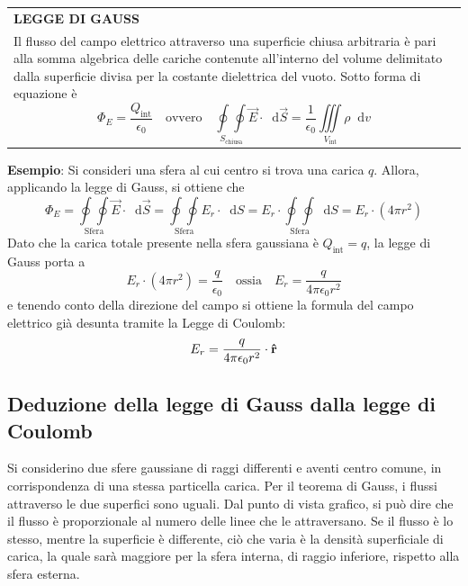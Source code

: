 \documentclass[a4paper]{extarticle}
\renewcommand\arraystretch{}
\newcommand\dif{\mathop{}\!\mathrm{d}}
\begin{document}
\vspace{1em}
\setlength{\tabcolsep}{14pt}
\renewcommand{\arraystretch}{2}
\noindent
\begin{tabularx}{\textwidth}{@{}|P|@{}}
    \hline
    {\textbf{LEGGE DI GAUSS}}\\
    \parbox{\linewidth}{Il flusso del campo elettrico attraverso una superficie chiusa arbitraria è pari alla somma algebrica delle cariche contenute all'interno del volume delimitato dalla superficie divisa per la costante dielettrica del vuoto.\\
    Sotto forma di equazione è
    \[\boxed{\Phi_E = \dfrac{Q_{\text{int}}}{\epsilon_0} \hspace{1em} \text{ovvero} \hspace{1em} \underset{S_\text{chiusa}}{\oint \oint} \vec{E} \cdot \dif \vec{S} = \frac{1}{\epsilon_0} \underset{V_\text{int}}{\iiint} \rho \dif v}\]
    \vspace{3mm}}\\
    \hline
\end{tabularx}

\vspace{2em}
\noindent
\textbf{Esempio}: Si consideri una sfera al cui centro si trova una carica $q$. Allora, applicando la legge di Gauss, si ottiene che
\[\Phi_E = \underset{\text{Sfera}}{\oint \oint} \vec{E} \cdot \dif \vec{S} = \underset{\text{Sfera}}{\oint \oint} E_r \cdot \dif S = E_r \cdot \underset{\text{Sfera}}{\oint \oint} \dif S = E_r \cdot (4 \pi r^2)\]
Dato che la carica totale presente nella sfera gaussiana è $Q_{\text{int}} = q$, la legge di Gauss porta a
\[E_r \cdot \left(4 \pi r^2\right) = \frac{q}{\epsilon_0} \hspace{1em} \text{ossia} \hspace{1em} E_r = \frac{q}{4 \pi \epsilon_0 r^2}\]
e tenendo conto della direzione del campo si ottiene la formula del campo elettrico già desunta tramite la Legge di Coulomb:
\[E_r = \frac{q}{4 \pi \epsilon_0 r^2} \cdot \bf{\hat{r}}\]

\vspace{1em}
\subsection{Deduzione della legge di Gauss dalla legge di Coulomb}
Si considerino due sfere gaussiane di raggi differenti e aventi centro comune, in corrispondenza di una stessa particella carica. Per il teorema di Gauss, i flussi attraverso le due superfici sono uguali. Dal punto di vista grafico, si può dire che il flusso è proporzionale al numero delle linee che le attraversano. Se il flusso è lo stesso, mentre la superficie è differente, ciò che varia è la densità superficiale di carica, la quale sarà maggiore per la sfera interna, di raggio inferiore, rispetto alla sfera esterna.
\end{document}
